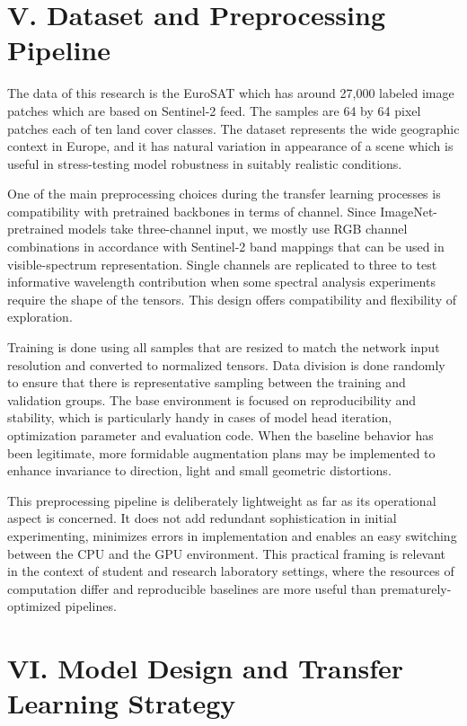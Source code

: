 ﻿\documentclass[conference]{IEEEtran}
\begin{document}
\section*{V. Dataset and Preprocessing Pipeline}

The data of this research is the EuroSAT which has around 27,000 labeled image patches which are based on Sentinel-2 feed. The samples are 64 by 64 pixel patches each of ten land cover classes. The dataset represents the wide geographic context in Europe, and it has natural variation in appearance of a scene which is useful in stress-testing model robustness in suitably realistic conditions.

One of the main preprocessing choices during the transfer learning processes is compatibility with pretrained backbones in terms of channel. Since ImageNet-pretrained models take three-channel input, we mostly use RGB channel combinations in accordance with Sentinel-2 band mappings that can be used in visible-spectrum representation. Single channels are replicated to three to test informative wavelength contribution when some spectral analysis experiments require the shape of the tensors. This design offers compatibility and flexibility of exploration.

Training is done using all samples that are resized to match the network input resolution and converted to normalized tensors. Data division is done randomly to ensure that there is representative sampling between the training and validation groups. The base environment is focused on reproducibility and stability, which is particularly handy in cases of model head iteration, optimization parameter and evaluation code. When the baseline behavior has been legitimate, more formidable augmentation plans may be implemented to enhance invariance to direction, light and small geometric distortions.

This preprocessing pipeline is deliberately lightweight as far as its operational aspect is concerned. It does not add redundant sophistication in initial experimenting, minimizes errors in implementation and enables an easy switching between the CPU and the GPU environment. This practical framing is relevant in the context of student and research laboratory settings, where the resources of computation differ and reproducible baselines are more useful than prematurely-optimized pipelines.

\section*{VI. Model Design and Transfer Learning Strategy}
\end{document}
